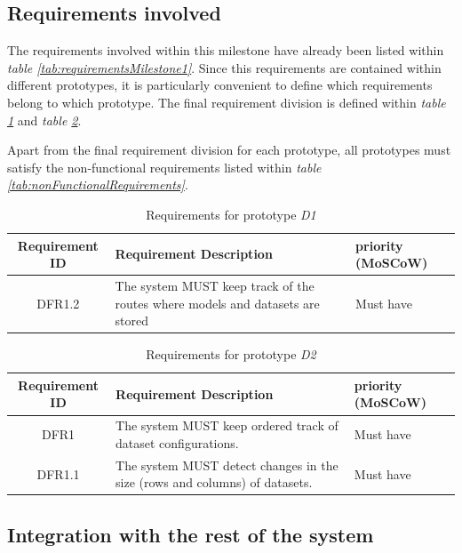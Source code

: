 \subsection{Requirements involved}

The requirements involved within this milestone have already been listed within \emph{table \ref{tab:requirementsMilestone1}}. Since this requirements are contained within different prototypes,
it is particularly convenient to define which requirements belong to which prototype. The final requirement division is defined within \emph{table \ref{tab:requirementsD1}} and \emph{table \ref{tab:requirementsD2}}.

Apart from the final requirement division for each prototype, all prototypes must satisfy the non-functional requirements listed within \emph{table \ref{tab:nonFunctionalRequirements}}.

\begin{table}[H]
    \centering
    \begin{tabular}{ | c | p{9cm} | p{3cm} |}
        \hline
        \textbf{Requirement ID} & \textbf{Requirement Description} & \textbf{priority (MoSCoW)} \\ \hline
        DFR1.2   & The system MUST keep track of the routes where models and datasets are stored    & Must have\\ \hline
    \end{tabular}
    \caption{Requirements for prototype \emph{D1}}
    \label{tab:requirementsD1}
\end{table}

\begin{table}[H]
    \centering
    \begin{tabular}{ | c | p{9cm} | p{3cm} |}
        \hline
        \textbf{Requirement ID} & \textbf{Requirement Description} & \textbf{priority (MoSCoW)} \\ \hline
		DFR1     & The system MUST keep ordered track of dataset configurations.                    & Must have\\ \hline
		DFR1.1   & The system MUST detect changes in the size (rows and columns) of datasets.       & Must have\\ \hline
    \end{tabular}
    \caption{Requirements for prototype \emph{D2}}
    \label{tab:requirementsD2}
\end{table}

\subsection{Integration with the rest of the system}

